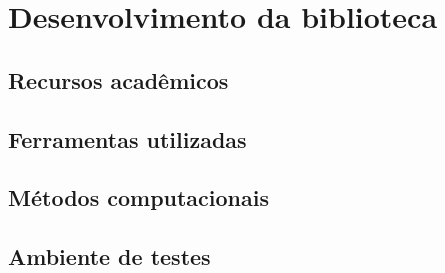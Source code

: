 \chapter{Desenvolvimento da biblioteca} %
\label{cha:desenvolvimento_da_biblioteca}

\section{Recursos acadêmicos} %
\label{sec:recursos_acad_micos}


\section{Ferramentas utilizadas} %
\label{sec:ferramentas_utilizadas}


\section{Métodos computacionais} %
\label{sec:m_todos_computacionais}


\section{Ambiente de testes} %
\label{sec:ambiente_de_testes}

